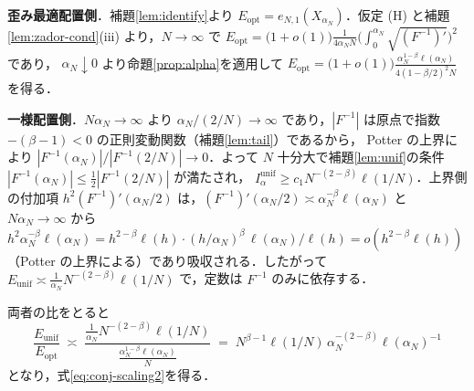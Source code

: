 \documentclass[a4paper,10pt]{jsarticle}
\makeatletter
\theoremstyle{definition}
\renewenvironment{proof}[1][\proofname]{\par
  \pushQED{\qed}%
  \normalfont \topsep6\p@\@plus6\p@\relax
  \trivlist
  \item[\hskip\labelsep\textbf{#1}]\ignorespaces
}{%
  \popQED\endtrivlist\@endpefalse
}
\renewcommand{\proofname}{証明}
\newcommand{\Finv}{F^{-1}}
\newcommand{\eN}{e_{N,1}}
\newcommand{\Eunif}{E_{\mathrm{unif}}}
\newcommand{\Eopt}{E_{\mathrm{opt}}}
\newcommand{\Iunif}{I_\alpha^{\mathrm{unif}}}
\makeatother
\begin{document}
\begin{proof}[系\ref{cor:joint} の証明]
\textbf{歪み最適配置側}．補題\ref{lem:identify}より $\Eopt=\eN(X_{\alpha_N})$．仮定 (H) と補題\ref{lem:zador-cond}(iii) より，$N\to\infty$ で
$\Eopt=\bigl(1+o(1)\bigr)\frac1{4\alpha_N N}\bigl(\int_0^{\alpha_N}\sqrt{(\Finv)'}\bigr)^2$ であり，
$\alpha_N\downarrow0$ より命題\ref{prop:alpha}を適用して
$\Eopt=\bigl(1+o(1)\bigr)\frac{\alpha_N^{1-\beta}\ell(\alpha_N)}{4(1-\beta/2)^2N}$ を得る．

\textbf{一様配置側}．$N\alpha_N\to\infty$ より $\alpha_N/(2/N)\to\infty$ であり，$|\Finv|$ は原点で指数 $-(\beta-1)<0$ の正則変動関数（補題\ref{lem:tail}）であるから，
Potter の上界により $|\Finv(\alpha_N)|/|\Finv(2/N)|\to0$．よって $N$ 十分大で補題\ref{lem:unif}の条件 $|\Finv(\alpha_N)|\le\frac12|\Finv(2/N)|$ が満たされ，
$\Iunif\ge c_1N^{-(2-\beta)}\ell(1/N)$．上界側の付加項 $h^2(\Finv)'(\alpha_N/2)$ は，$(\Finv)'(\alpha_N/2)\asymp\alpha_N^{-\beta}\ell(\alpha_N)$ と
$N\alpha_N\to\infty$ から $h^2\alpha_N^{-\beta}\ell(\alpha_N)=h^{2-\beta}\ell(h)\cdot(h/\alpha_N)^{\beta}\,\ell(\alpha_N)/\ell(h)=o(h^{2-\beta}\ell(h))$
（Potter の上界による）であり吸収される．したがって $\Eunif\asymp\frac1{\alpha_N}N^{-(2-\beta)}\ell(1/N)$ で，定数は $\Finv$ のみに依存する．

両者の比をとると
\begin{equation*}
  \frac{\Eunif}{\Eopt}
  \;\asymp\;\frac{\frac1{\alpha_N}N^{-(2-\beta)}\ell(1/N)}{\frac{\alpha_N^{1-\beta}\ell(\alpha_N)}{N}}
  \;=\;N^{\beta-1}\ell(1/N)\,\alpha_N^{-(2-\beta)}\ell(\alpha_N)^{-1}
\end{equation*}
となり，式\eqref{eq:conj-scaling2}を得る．
\end{proof}
\end{document}
